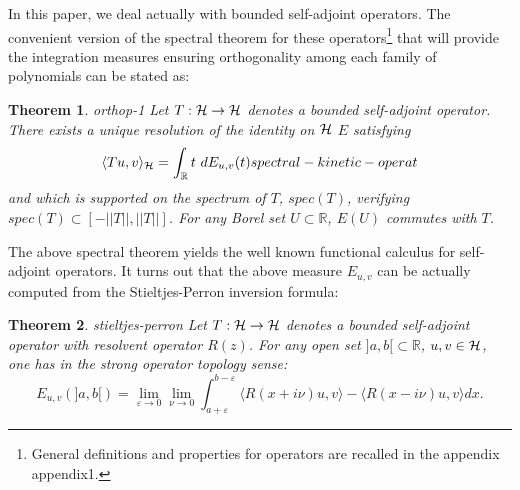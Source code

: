 \documentclass[10pt]{book}
\let\int\int
\theoremstyle{break}
\newtheorem{theorem}{Theorem}
\begin{document}
In this paper, we deal actually with bounded self-adjoint operators. The convenient version of the spectral theorem for these operators{\footnote{General definitions and properties for operators are recalled in the appendix {appendix1}.}} that will provide the integration measures ensuring orthogonality among each family of polynomials can be stated as:
\begin{theorem}{orthop-1}
Let $T:{\cal{H}}\to{\cal{H}}$ denotes a bounded self-adjoint operator. There exists a unique resolution of the identity on ${\cal{H}} $ $E$ satisfying 
\begin{equation*}
\langle Tu,v \rangle_{\cal{H}}=\int_{\mathbb{R}}t\ dE_{u,v}(t){spectral-kinetic-operat}
\end{equation*}
and which is supported on the spectrum of $T$, $spec(T)$, verifying $spec(T)\subset[-||T|| ,||T||]$. For any Borel set $U\subset\mathbb{R}$, $E(U)$ commutes with $T$.
\end{theorem}
The above spectral theorem yields the well known functional calculus for self-adjoint operators. It turns out that the above measure $E_{u,v}$ can be actually computed from the Stieltjes-Perron inversion formula:
\begin{theorem}{stieltjes-perron}
Let $T:{\cal{H}}\to{\cal{H}}$ denotes a bounded self-adjoint operator with resolvent operator $R(z)$. For any open set $]a,b[\subset\mathbb{R}$, $u,v\in\cal{H}$, one has in the strong operator topology sense:
\begin{equation*}
E_{u,v}(]a,b[)=\lim_{\varepsilon\to0}\lim_{\nu\to0 }\int_{a+\varepsilon}^{b-\varepsilon}\langle R(x+i\nu)u,v \rangle-\langle R(x-i\nu)u,v \rangle dx.
\end{equation*}
\end{theorem}



\end{document}
